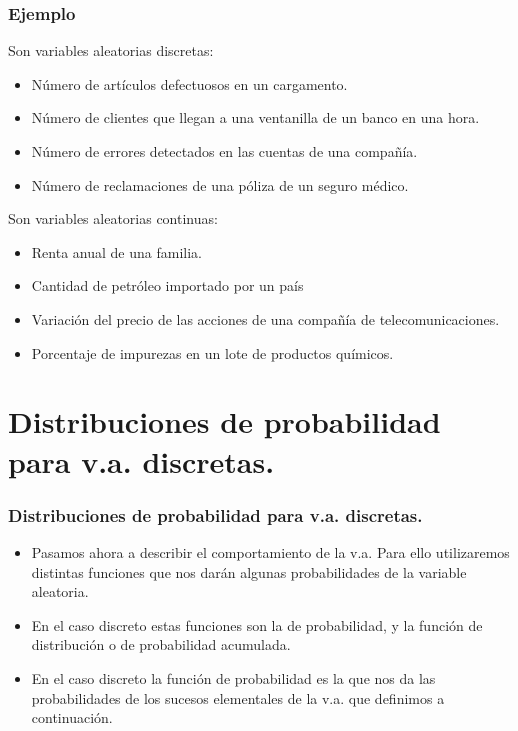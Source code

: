 \documentclass[handout]{beamer}\usepackage[]{graphicx}\usepackage[]{color}
\renewcommand{\emph}[1]{{\color{red}#1}}
\theoremstyle{plain}
\theoremstyle{definition}
\begin{document}
\begin{frame}
\frametitle{Ejemplo}
      Son variables \emph{aleatorias discretas}:
      \begin{itemize}
          \item  Número de artículos defectuosos en un cargamento.
          \item  Número de clientes que llegan a una ventanilla de un
          banco en una hora.
          \item  Número de errores detectados en las cuentas de una
          compañía.
          \item  Número de reclamaciones de una póliza de un seguro
          médico.
      \end{itemize}
\end{frame}

\begin{frame}
       Son variables \emph{aleatorias continuas}:
      \begin{itemize}
          \item  Renta anual de una familia.
          \item Cantidad de petróleo importado por un país
          \item  Variación del precio de las acciones de una compañía
          de telecomunicaciones.
          \item  Porcentaje de impurezas en un lote de productos
          químicos.
      \end{itemize}
%
\end{frame}

\section{Distribuciones de probabilidad para v.a. discretas.}

\begin{frame}
\frametitle{Distribuciones de probabilidad para v.a. discretas.}
\begin{itemize}
\item Pasamos ahora a describir el comportamiento  de la v.a. 
Para ello utilizaremos distintas
funciones que nos darán algunas probabilidades de la variable aleatoria.
\item En el caso discreto estas funciones son la de probabilidad, y  la función de distribución o de probabilidad acumulada.
\item En el caso discreto la función de probabilidad es la que nos da las probabilidades de los
sucesos elementales de la v.a. que definimos a continuación.
\end{itemize}
\end{frame}
\end{document}
